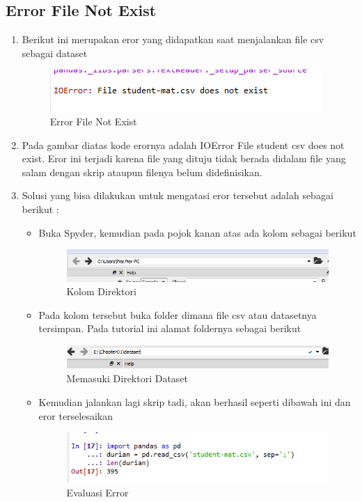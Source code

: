 \subsection{Error File Not Exist}
\begin{enumerate}
	\item
Berikut ini merupakan eror yang didapatkan saat menjalankan file csv sebagai dataset
\begin{figure}[ht]
\centering
\includegraphics[scale=0.5]{figures/erorspyder2.png}
\caption{Error File Not Exist}
\label{Error}
\end{figure}
	\item
Pada gambar diatas kode erornya adalah IOError File student csv does not exist. Eror ini terjadi karena file yang dituju tidak berada didalam file yang salam dengan skrip ataupun filenya belum didefinisikan.
	\item
Solusi yang bisa dilakukan untuk mengatasi eror tersebut adalah sebagai berikut : \\
\begin{itemize}
\item
Buka Spyder, kemudian pada pojok kanan atas ada kolom sebagai berikut
\begin{figure}[ht]
\centering
\includegraphics[scale=0.5]{figures/solusi6.png}
\caption{Kolom Direktori}
\label{Eror}
\end{figure}
\item
Pada kolom tersebut buka folder dimana file csv atau datasetnya tersimpan. Pada tutorial ini alamat foldernya sebagai berikut
\begin{figure}[ht]
\centering
\includegraphics[scale=0.5]{figures/solusi7.png}
\caption{Memasuki Direktori Dataset}
\label{Eror}
\end{figure}
\item
Kemudian jalankan lagi skrip tadi, akan berhasil seperti dibawah ini dan eror terselesaikan
\begin{figure}[ht]
\centering
\includegraphics[scale=0.5]{figures/solusi8.png}
\caption{Evaluasi Error}
\label{Eror}
\end{figure}
\end{itemize}
\end{enumerate}

